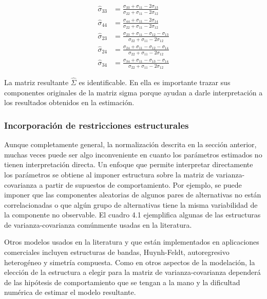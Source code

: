 \documentclass[
]{book}
\begin{document}
\[
\begin{aligned}
\hat{\sigma}_{33} &= \frac{\sigma_{33} + \sigma_{11} - 2\sigma_{13}}{\sigma_{22} + \sigma_{11} - 2\sigma_{12}}\\
\hat{\sigma}_{44} &= \frac{\sigma_{44} + \sigma_{11} - 2\sigma_{14}}{\sigma_{22} + \sigma_{11} - 2\sigma_{12}}\\
\hat{\sigma}_{23} &= \frac{\sigma_{23} + \sigma_{11} - \sigma_{12} - \sigma_{13}}{\sigma_{22} + \sigma_{11} - 2\sigma_{12}}\\
\hat{\sigma}_{24} &= \frac{\sigma_{24} + \sigma_{11} - \sigma_{12} - \sigma_{14}}{\sigma_{22} + \sigma_{11} - 2\sigma_{12}}\\
\hat{\sigma}_{34} &= \frac{\sigma_{34} + \sigma_{11} - \sigma_{13} - \sigma_{14}}{\sigma_{22} + \sigma_{11} - 2\sigma_{12}}
\end{aligned}
\]

La matriz resultante \(\hat{Σ}\) es identificable. En ella es importante trazar sus componentes originales de la matriz sigma porque ayudan a darle interpretación a los resultados obtenidos en la estimación.

\subsubsection{Incorporación de restricciones estructurales}\label{incorporaciuxf3n-de-restricciones-estructurales}

Aunque completamente general, la normalización descrita en la sección anterior, muchas veces puede ser algo inconveniente en cuanto los parámetros estimados no tienen interpretación
directa. Un enfoque que permite interpretar directamente los parámetros se obtiene al imponer estructura sobre la matriz de varianza-covarianza a partir de supuestos de comportamiento. Por ejemplo, se puede imponer que las componentes aleatorias de algunos pares de alternativas no están correlacionadas o que algún grupo de alternativas tiene la misma variabilidad de la componente no observable. El cuadro 4.1 ejemplifica algunas de las estructuras de varianza-covarianza comúnmente usadas en la literatura.

Otros modelos usados en la literatura y que están implementados en aplicaciones comerciales incluyen estructuras de bandas, Huynh-Feldt, autoregresivo heterogéneo y simetría compuesta. Como en otros aspectos de la modelación, la elección de la estructura a elegir para la matriz de
varianza-covarianza dependerá de las hipótesis de comportamiento que se tengan a la mano y la dificultad numérica de estimar el modelo resultante.
\end{document}
